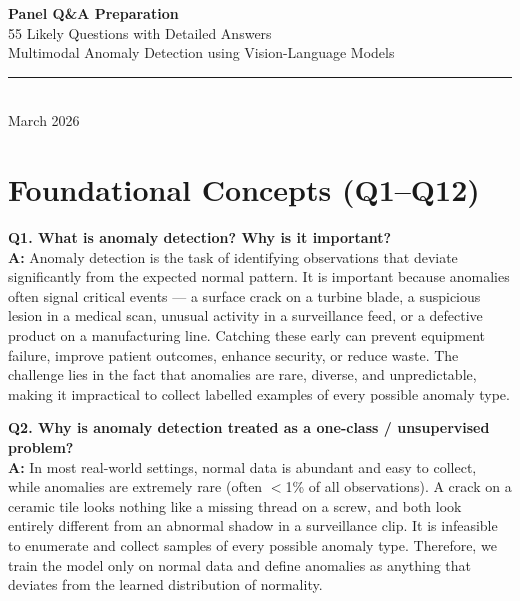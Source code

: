 \documentclass[12pt, a4paper]{article}
\begin{document}
\begin{center}
{\Huge\bfseries\color{qcolor} Panel Q\&A Preparation}\\[0.3cm]
{\Large 55 Likely Questions with Detailed Answers}\\[0.5cm]
{\large Multimodal Anomaly Detection using Vision-Language Models}\\[0.3cm]
\rule{0.7\textwidth}{0.5pt}\\[0.3cm]
{\normalsize March 2026}
\end{center}

\tableofcontents
\newpage

\section{Foundational Concepts (Q1--Q12)}

\begin{qa}
\textbf{Q1. What is anomaly detection? Why is it important?}\\[4pt]
\textbf{A:} Anomaly detection is the task of identifying observations that deviate significantly from the expected normal pattern. It is important because anomalies often signal critical events --- a surface crack on a turbine blade, a suspicious lesion in a medical scan, unusual activity in a surveillance feed, or a defective product on a manufacturing line. Catching these early can prevent equipment failure, improve patient outcomes, enhance security, or reduce waste. The challenge lies in the fact that anomalies are rare, diverse, and unpredictable, making it impractical to collect labelled examples of every possible anomaly type.
\end{qa}

\begin{qa}
\textbf{Q2. Why is anomaly detection treated as a one-class / unsupervised problem?}\\[4pt]
\textbf{A:} In most real-world settings, normal data is abundant and easy to collect, while anomalies are extremely rare (often $<$1\% of all observations). A crack on a ceramic tile looks nothing like a missing thread on a screw, and both look entirely different from an abnormal shadow in a surveillance clip. It is infeasible to enumerate and collect samples of every possible anomaly type. Therefore, we train the model only on normal data and define anomalies as anything that deviates from the learned distribution of normality.
\end{qa}
\end{document}
